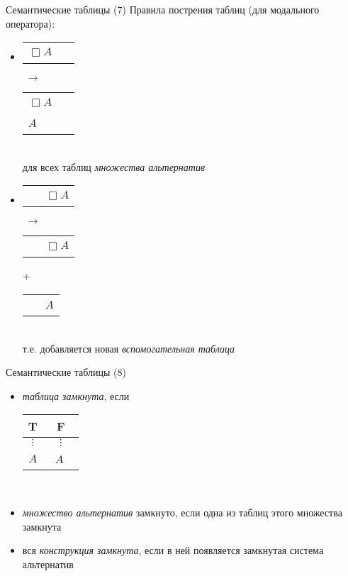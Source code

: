 \documentclass{beamer}
\begin{document}
\begin{frame}{Семантические таблицы (7)}
Правила пострения таблиц (для модального оператора):\\
\bigskip
\begin{itemize}
  \item 
      \begin{tabular}{p{0.75cm}|p{0.75cm}}
        \hline
        $\Box A$ & ~ \\
      \end{tabular}
      $\; \to \;$
      \begin{tabular}{p{0.75cm}|p{0.75cm}}
        \hline
        $\Box A$ & ~ \\
        $A$ & ~ \\
      \end{tabular}\\
      \bigskip
      {\scriptsize для всех таблиц \textit{множества альтернатив}}\\
      \bigskip
  \item 
      \begin{tabular}{p{0.75cm}|p{0.75cm}}
        \hline
        ~ & $\Box A$ \\
      \end{tabular}
      $\; \to \;$
      \begin{tabular}{p{0.75cm}|p{0.75cm}}
        \hline
        ~ & $\Box A$ \\
      \end{tabular} +
      \begin{tabular}{p{0.75cm}|p{0.75cm}}
        \hline
        ~ & $A$ \\
      \end{tabular}\\
      \bigskip
      {\scriptsize т.е. добавляется новая \textit{вспомогательная таблица}}\\
\end{itemize}
\end{frame}

\begin{frame}{Семантические таблицы (8)}
\begin{itemize}
  \item \textit{таблица замкнута}, если
      \begin{tabular}{c|c}
        T & F \\ \hline
        $\vdots$ & $\vdots$ \\
        $A$ & $\; \; A$ ~ \\
      \end{tabular}\\
      \bigskip
  \item \textit{множество альтернатив} замкнуто, если одна из таблиц этого множества замкнута
  \item вся \textit{конструкция замкнута}, если в ней появляется замкнутая система альтернатив
\end{itemize}
\end{frame}
\end{document}
